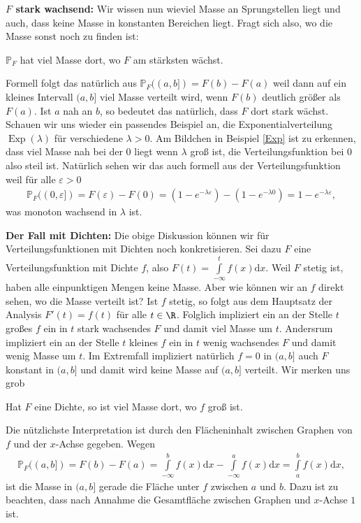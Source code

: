 \begin{disc}
	\textbf{$F$ stark wachsend:} Wir wissen nun wieviel Masse an Sprungstellen liegt und auch, dass keine Masse in konstanten Bereichen liegt. Fragt sich also, wo die Masse sonst noch zu finden ist: 
	\begin{center}
		\glqq $\mathbb{P}_F$ hat viel Masse dort, wo $F$ am st\"arksten wächst.\grqq
	\end{center}
	Formell folgt das nat\"urlich aus $\mathbb P_F((a,b])=F(b)-F(a)$ weil dann auf ein kleines Intervall $(a,b]$ viel Masse verteilt wird, wenn $F(b)$ deutlich gr\"o\ss er als $F(a)$. Ist $a$ nah an $b$, so bedeutet das nat\"urlich, dass $F$ dort stark w\"achst. Schauen wir uns wieder ein passendes Beispiel an, die Exponentialverteilung $\operatorname{Exp}(\lambda)$ f\"ur verschiedene $\lambda>0$. Am Bildchen in Beispiel \ref{Exp} ist zu erkennen, dass viel Masse nah bei der $0$ liegt wenn $\lambda$ gro\ss{} ist, die Verteilungsfunktion bei $0$ also steil ist. Nat\"urlich sehen wir das auch formell aus der Verteilungsfunktion weil f\"ur alle $\varepsilon>0$
\begin{align*}
	\mathbb P_F((0,\varepsilon])=F(\varepsilon)-F(0)= (1-e^{-\lambda \varepsilon})-(1-e^{-\lambda 0})=1-e^{-\lambda \varepsilon},
\end{align*}
	was monoton wachsend in $\lambda$ ist.\smallskip
	
	\textbf{Der Fall mit Dichten:} Die obige Diskussion k\"onnen wir f\"ur Verteilungsfunktionen mit Dichten noch konkretisieren. Sei dazu $F$ eine Verteilungsfunktion mit Dichte $f$, also $F(t) = \int\limits_{-\infty}^{t}  f(x) \mathrm{d}x$. Weil $F$ stetig ist, haben alle einpunktigen Mengen keine Masse. Aber wie k\"onnen wir an $f$ direkt sehen, wo die Masse verteilt ist? Ist $f$ stetig, so folgt aus dem Hauptsatz der Analysis $F'(t)=f(t)$ f\"ur alle $t\in \R$. Folglich impliziert ein an der Stelle $t$ gro\ss es $f$ ein in $t$ stark wachsendes $F$ und damit viel Masse um $t$. Andersrum impliziert ein an der Stelle $t$ kleines $f$ ein in $t$ wenig wachsendes $F$ und damit wenig Masse um $t$. Im Extremfall impliziert nat\"urlich $f=0$ in $(a,b]$ auch $F$ konstant in $(a,b]$ und damit wird keine Masse auf $(a,b]$ verteilt. Wir merken uns grob 
	\begin{center}
		\glqq Hat $F$ eine Dichte, so ist viel Masse dort, wo $f$ gro\ss{} ist.\grqq
	\end{center}	
	 Die n\"utzlichste Interpretation ist durch den Fl\"acheninhalt zwischen Graphen von $f$ und der $x$-Achse gegeben. Wegen	
		\begin{align*}
			\mathbb{P}_F((a,b]) 
			= F(b)-F(a)
			= \int\limits_{-\infty}^{b} f(x) \mathrm{d}x - \int\limits_{-\infty}^{a} f(x) \mathrm{d}x 
			=\int\limits_{a}^{b} f(x) \mathrm{d}x,
		\end{align*}
		ist die Masse in $(a,b]$ gerade die Fl\"ache unter $f$ zwischen $a$ und $b$. Dazu ist zu beachten, dass nach Annahme die Gesamtfl\"ache zwischen Graphen und $x$-Achse $1$ ist. 		
		

\end{disc}
